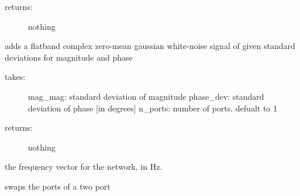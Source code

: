 \documentclass[letterpaper,10pt,english]{sphinxmanual}
\begin{document}
\begin{fulllineitems}
\begin{fulllineitems}
\begin{description}
\item[{returns:}] \leavevmode
nothing

\end{description}

\end{fulllineitems}


\begin{fulllineitems}
\label{api/mwavepy:mwavepy.network.Network.add_noise_polar_flatband}
adds a flatband complex zero-mean gaussian white-noise signal of
given standard deviations for magnitude and phase
\begin{description}
\item[{takes:}] \leavevmode
mag\_mag: standard deviation of magnitude
phase\_dev: standard deviation of phase {[}in degrees{]}
n\_ports: number of ports. defualt to 1

\item[{returns:}] \leavevmode
nothing

\end{description}

\end{fulllineitems}


\begin{fulllineitems}
\label{api/mwavepy:mwavepy.network.Network.change_frequency}
\end{fulllineitems}


\begin{fulllineitems}
\label{api/mwavepy:mwavepy.network.Network.f}
the frequency vector for the network, in Hz.

\end{fulllineitems}


\begin{fulllineitems}
\label{api/mwavepy:mwavepy.network.Network.flip}
swaps the ports of a two port


\end{fulllineitems}
\end{fulllineitems}
\end{document}
